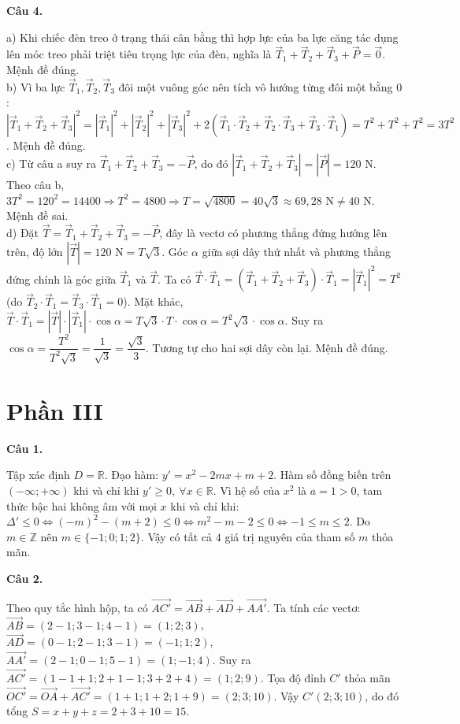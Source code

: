 \documentclass[12pt,a4paper]{article}
\newcommand{\loigiai}[1]{\par\medskip\Needspace{4\baselineskip}\noindent\textbf{#1}\par\nobreak}
\begin{document}
\loigiai{Câu 4.}
a) Khi chiếc đèn treo ở trạng thái cân bằng thì hợp lực của ba lực căng tác dụng lên móc treo phải triệt tiêu trọng lực của đèn, nghĩa là $\vec{T}_1+\vec{T}_2+\vec{T}_3+\vec{P}=\vec{0}$. Mệnh đề đúng.\\
b) Vì ba lực $\vec{T}_1, \vec{T}_2, \vec{T}_3$ đôi một vuông góc nên tích vô hướng từng đôi một bằng $0$:
$|\vec{T}_1+\vec{T}_2+\vec{T}_3|^2=|\vec{T}_1|^2+|\vec{T}_2|^2+|\vec{T}_3|^2+2(\vec{T}_1\cdot\vec{T}_2+\vec{T}_2\cdot\vec{T}_3+\vec{T}_3\cdot\vec{T}_1)=T^2+T^2+T^2=3T^2$. Mệnh đề đúng.\\
c) Từ câu a suy ra $\vec{T}_1+\vec{T}_2+\vec{T}_3=-\vec{P}$, do đó $|\vec{T}_1+\vec{T}_2+\vec{T}_3|=|\vec{P}|=120\text{ N}$.
Theo câu b, $3T^2=120^2=14400\Rightarrow T^2=4800\Rightarrow T=\sqrt{4800}=40\sqrt{3}\approx 69{,}28\text{ N}\ne 40\text{ N}$. Mệnh đề sai.\\
d) Đặt $\vec{T}=\vec{T}_1+\vec{T}_2+\vec{T}_3=-\vec{P}$, đây là vectơ có phương thẳng đứng hướng lên trên, độ lớn $|\vec{T}|=120\text{ N}=T\sqrt{3}$.
Góc $\alpha$ giữa sợi dây thứ nhất và phương thẳng đứng chính là góc giữa $\vec{T}_1$ và $\vec{T}$.
Ta có $\vec{T}\cdot\vec{T}_1=(\vec{T}_1+\vec{T}_2+\vec{T}_3)\cdot\vec{T}_1=|\vec{T}_1|^2=T^2$ (do $\vec{T}_2\cdot\vec{T}_1=\vec{T}_3\cdot\vec{T}_1=0$).
Mặt khác, $\vec{T}\cdot\vec{T}_1=|\vec{T}|\cdot|\vec{T}_1|\cdot\cos\alpha=T\sqrt{3}\cdot T\cdot\cos\alpha=T^2\sqrt{3}\cdot\cos\alpha$.
Suy ra $\cos\alpha=\dfrac{T^2}{T^2\sqrt{3}}=\dfrac{1}{\sqrt{3}}=\dfrac{\sqrt{3}}{3}$. Tương tự cho hai sợi dây còn lại. Mệnh đề đúng.

\newpage
\section*{\large Phần III}
\loigiai{Câu 1.}
Tập xác định $D=\mathbb{R}$. Đạo hàm: $y'=x^2-2mx+m+2$.
Hàm số đồng biến trên $(-\infty;+\infty)$ khi và chỉ khi $y'\ge 0,\ \forall x\in\mathbb{R}$.
Vì hệ số của $x^2$ là $a=1>0$, tam thức bậc hai không âm với mọi $x$ khi và chỉ khi:
$\Delta'\le 0\Leftrightarrow (-m)^2-(m+2)\le 0\Leftrightarrow m^2-m-2\le 0\Leftrightarrow -1\le m\le 2$.
Do $m\in\mathbb{Z}$ nên $m\in\{-1;0;1;2\}$.
Vậy có tất cả $4$ giá trị nguyên của tham số $m$ thỏa mãn.

\loigiai{Câu 2.}
Theo quy tắc hình hộp, ta có $\vec{AC'}=\vec{AB}+\vec{AD}+\vec{AA'}$.
Ta tính các vectơ:
$\vec{AB}=(2-1;3-1;4-1)=(1;2;3)$,
$\vec{AD}=(0-1;2-1;3-1)=(-1;1;2)$,
$\vec{AA'}=(2-1;0-1;5-1)=(1;-1;4)$.
Suy ra $\vec{AC'}=(1-1+1;2+1-1;3+2+4)=(1;2;9)$.
Tọa độ đỉnh $C'$ thỏa mãn $\vec{OC'}=\vec{OA}+\vec{AC'}=(1+1;1+2;1+9)=(2;3;10)$.
Vậy $C'(2;3;10)$, do đó tổng $S=x+y+z=2+3+10=15$.
\end{document}
